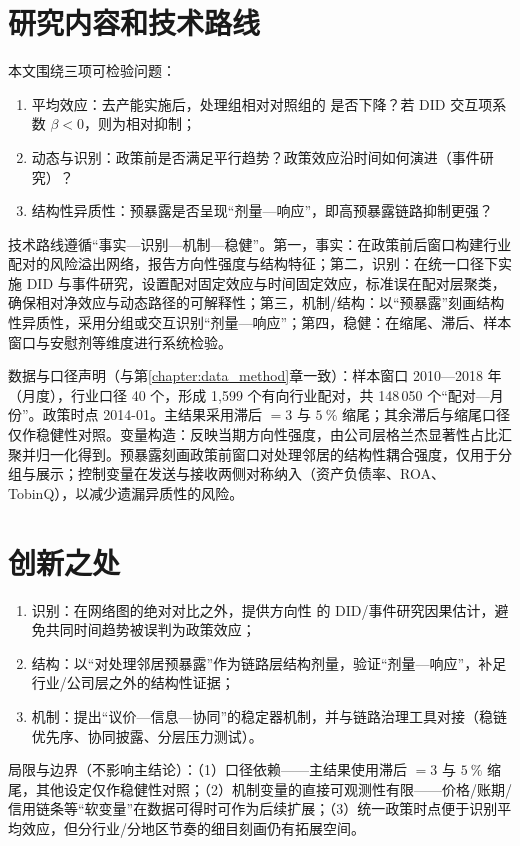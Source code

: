 \section{研究内容和技术路线}
本文围绕三项可检验问题：
\begin{enumerate}
  \item 平均效应：去产能实施后，处理组相对对照组的 \II 是否下降？若 DID 交互项系数 $\beta<0$，则为相对抑制；
  \item 动态与识别：政策前是否满足平行趋势？政策效应沿时间如何演进（事件研究）？
  \item 结构性异质性：预暴露是否呈现“剂量—响应”，即高预暴露链路抑制更强？
\end{enumerate}

技术路线遵循“事实—识别—机制—稳健”。第一，事实：在政策前后窗口构建行业配对的风险溢出网络，报告方向性强度与结构特征；第二，识别：在统一口径下实施 DID 与事件研究，设置配对固定效应与时间固定效应，标准误在配对层聚类，确保相对净效应与动态路径的可解释性；第三，机制/结构：以“预暴露”刻画结构性异质性，采用分组或交互识别“剂量—响应”；第四，稳健：在缩尾、滞后、样本窗口与安慰剂等维度进行系统检验。

数据与口径声明（与第\ref{chapter:data_method}章一致）：样本窗口 2010—2018 年（月度），行业口径 40 个，形成 1,599 个有向行业配对，共 148\,050 个“配对—月份”。政策时点 2014-01。主结果采用滞后 $=3$ 与 $5~\%$ 缩尾；其余滞后与缩尾口径仅作稳健性对照。变量构造：\II 反映当期方向性强度，由公司层格兰杰显著性占比汇聚并归一化得到。预暴露刻画政策前窗口对处理邻居的结构性耦合强度，仅用于分组与展示；控制变量在发送与接收两侧对称纳入（资产负债率、ROA、TobinQ），以减少遗漏异质性的风险。



\section{创新之处}
\begin{enumerate}
  \item 识别：在网络图的绝对对比之外，提供方向性 \II 的 DID/事件研究因果估计，避免共同时间趋势被误判为政策效应；
  \item 结构：以“对处理邻居预暴露”作为链路层结构剂量，验证“剂量—响应”，补足行业/公司层之外的结构性证据；
  \item 机制：提出“议价—信息—协同”的稳定器机制，并与链路治理工具对接（稳链优先序、协同披露、分层压力测试）。
\end{enumerate}

局限与边界（不影响主结论）：（1）口径依赖——主结果使用滞后 $=3$ 与 $5~\%$ 缩尾，其他设定仅作稳健性对照；（2）机制变量的直接可观测性有限——价格/账期/信用链条等“软变量”在数据可得时可作为后续扩展；（3）统一政策时点便于识别平均效应，但分行业/分地区节奏的细目刻画仍有拓展空间。
